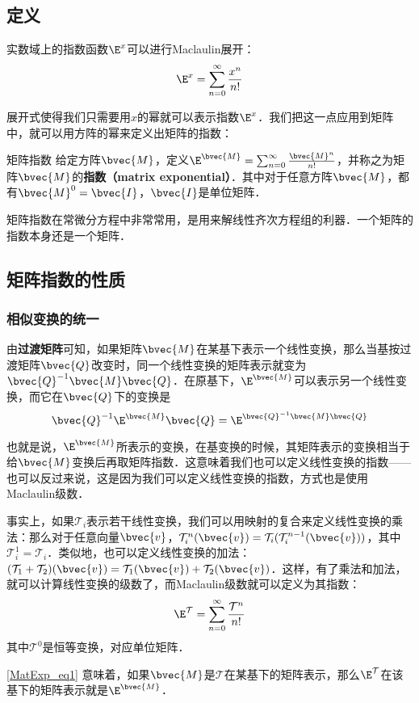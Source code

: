 

\subsection{定义}
实数域上的指数函数$\E^x$可以进行Maclaulin展开：\begin{equation}
\E^x=\sum\limits_{n=0}^\infty \frac{x^n}{n!}
\end{equation}

展开式使得我们只需要用$x$的幂就可以表示指数$\E^x$．我们把这一点应用到矩阵中，就可以用方阵的幂来定义出矩阵的指数：

\begin{definition}{矩阵指数}
给定方阵$\bvec{M}$，定义$\E^\bvec{M}=\sum_{n=0}^\infty \frac{\bvec{M}^n}{n!}$，并称之为矩阵$\bvec{M}$的\textbf{指数（matrix exponential）}．其中对于任意方阵$\bvec{M}$，都有$\bvec{M}^0=\bvec{I}$，$\bvec{I}$是单位矩阵．
\end{definition}

矩阵指数在常微分方程中非常常用，是用来解线性齐次方程组的利器．一个矩阵的指数本身还是一个矩阵．

\subsection{矩阵指数的性质}

\subsubsection{相似变换的统一}

由\textbf{过渡矩阵}可知，如果矩阵$\bvec{M}$在某基下表示一个线性变换，那么当基按过渡矩阵$\bvec{Q}$改变时，同一个线性变换的矩阵表示就变为$\bvec{Q}^{-1}\bvec{M}\bvec{Q}$．在原基下，$\E^\bvec{M}$可以表示另一个线性变换，而它在$\bvec{Q}$下的变换是
\begin{equation}\label{MatExp_eq1}
\bvec{Q}^{-1}\E^\bvec{M}\bvec{Q}=\E^{\bvec{Q}^{-1}\bvec{M}\bvec{Q}}
\end{equation}

也就是说，$\E^\bvec{M}$所表示的变换，在基变换的时候，其矩阵表示的变换相当于给$\bvec{M}$变换后再取矩阵指数．这意味着我们也可以定义线性变换的指数——也可以反过来说，这是因为我们可以定义线性变换的指数，方式也是使用Maclaulin级数．

事实上，如果$\mathcal{T}_i$表示若干线性变换，我们可以用映射的复合来定义线性变换的乘法：那么对于任意向量$\bvec{v}$，$\mathcal{T}^n_i(\bvec{v})=\mathcal{T}_i(\mathcal{T}^{n-1}_i(\bvec{v}))$，其中$\mathcal{T}_i^1=\mathcal{T}_i$．类似地，也可以定义线性变换的加法：$(\mathcal{T}_1+\mathcal{T}_2)(\bvec{v})=\mathcal{T}_1(\bvec{v})+\mathcal{T}_2(\bvec{v})$．这样，有了乘法和加法，就可以计算线性变换的级数了，而Maclaulin级数就可以定义为其指数：
\begin{equation}
\E^\mathcal{T}=\sum\limits_{n=0}^\infty \frac{\mathcal{T}^n}{n!}
\end{equation}
其中$\mathcal{T}^0$是恒等变换，对应单位矩阵．

\autoref{MatExp_eq1} 意味着，如果$\bvec{M}$是$\mathcal{T}$在某基下的矩阵表示，那么$\E^\mathcal{T}$在该基下的矩阵表示就是$\E^\bvec{M}$．










